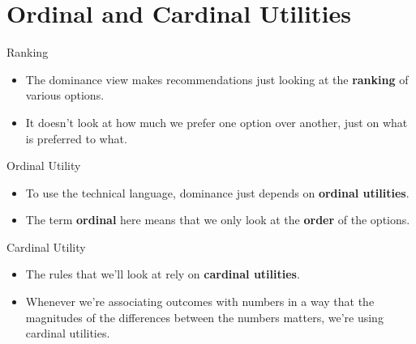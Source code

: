 \documentclass[
  ignorenonframetext,
]{beamer}
\providecommand{\tightlist}{%
  \setlength{\itemsep}{0pt}\setlength{\parskip}{0pt}}
\renewcommand{\,}{\text{, }}
\begin{document}
\hypertarget{ordinal-and-cardinal-utilities}{%
\section{Ordinal and Cardinal
Utilities}\label{ordinal-and-cardinal-utilities}}

\begin{frame}{Ranking}
\protect\hypertarget{ranking}{}

\begin{itemize}
\tightlist
\item
  The dominance view makes recommendations just looking at the
  \textbf{ranking} of various options.
\item
  It doesn't look at how much we prefer one option over another, just on
  what is preferred to what.
\end{itemize}

\end{frame}

\begin{frame}{Ordinal Utility}
\protect\hypertarget{ordinal-utility}{}

\begin{itemize}
\tightlist
\item
  To use the technical language, dominance just depends on
  \textbf{ordinal utilities}.
\item
  The term \textbf{ordinal} here means that we only look at the
  \textbf{order} of the options.
\end{itemize}

\end{frame}

\begin{frame}{Cardinal Utility}
\protect\hypertarget{cardinal-utility}{}

\begin{itemize}
\tightlist
\item
  The rules that we'll look at rely on \textbf{cardinal utilities}.
\item
  Whenever we're associating outcomes with numbers in a way that the
  magnitudes of the differences between the numbers matters, we're using
  cardinal utilities.
\end{itemize}

\end{frame}
\end{document}
